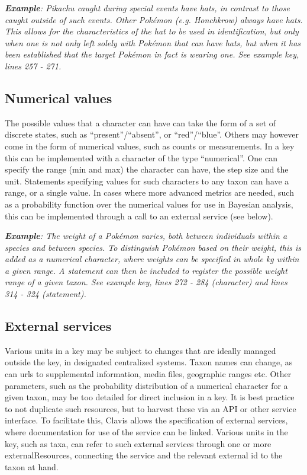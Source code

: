 \documentclass[10pt,letterpaper]{article}
\begin{document}

\textit{\textbf{Example}: Pikachu caught during special events have hats, in contrast to those caught outside of such events. Other Pokémon (e.g. Honchkrow) always have hats. This allows for the characteristics of the hat to be used in identification, but only when one is not only left solely with Pokémon that can have hats, but when it has been established that the target Pokémon in fact is wearing one. See example key, lines 257 - 271.}
\subsection*{
Numerical values
}
The possible values that a character can have can take the form of a set of discrete states, such as ``present''/``absent'', or ``red''/``blue''. Others may however come in the form of numerical values, such as counts or measurements. In a key this can be implemented with a character of the type ``numerical''. One can specify the range (min and max) the character can have, the step size and the unit. Statements specifying values for such characters to any taxon can have a range, or a single value. In cases where more advanced metrics are needed, such as a probability function over the numerical values for use in Bayesian analysis, this can be implemented through a call to an external service (see below).



\textit{\textbf{Example}: The weight of a Pokémon varies, both between individuals within a species and between species. To distinguish Pokémon based on their weight, this is added as a numerical character, where weights can be specified in whole kg within a given range. A statement can then be included to register the possible weight range of a given taxon. See example key, lines 272 - 284 (character) and lines 314 - 324 (statement).}
\subsection*{
External services
}
Various units in a key may be subject to changes that are ideally managed outside the key, in designated centralized systems. Taxon names can change, as can urls to supplemental information, media files, geographic ranges etc. Other parameters, such as the probability distribution of a numerical character for a given taxon, may be too detailed for direct inclusion in a key. It is best practice to not duplicate such resources, but to harvest these via an API or other service interface. To facilitate this, Clavis allows the specification of external services, where documentation for use of the service can be linked. Various units in the key, such as taxa, can refer to such external services through one or more externalResources, connecting the service and the relevant external id to the taxon at hand.
\end{document}
